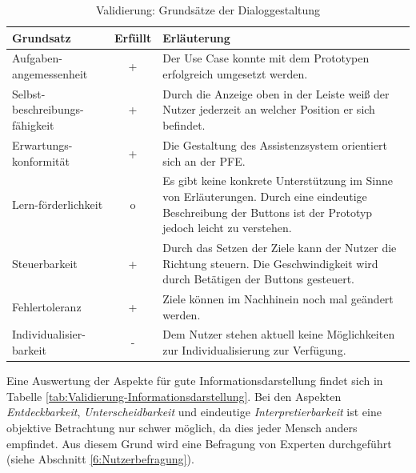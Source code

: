 \begin{table}[htb]
\caption{Validierung: Grundsätze der Dialoggestaltung}
\centering
\begin{tabular}{p{}|c|p{}}
\textbf{Grundsatz} & \textbf{Erfüllt} & \textbf{Erläuterung} \\
\hline
Aufgaben-angemessenheit & + & Der Use Case konnte mit dem Prototypen erfolgreich umgesetzt werden. \\
\hline
Selbst-beschreibungs-fähigkeit & + & Durch die Anzeige oben in der Leiste weiß der Nutzer jederzeit an welcher Position er sich befindet. \\
\hline
Erwartungs-konformität & + & Die Gestaltung des Assistenzsystem orientiert sich an der PFE.\\
\hline
Lern-förderlichkeit & o & Es gibt keine konkrete Unterstützung im Sinne von Erläuterungen. Durch eine eindeutige Beschreibung der Buttons ist der Prototyp jedoch leicht zu verstehen. \\
\hline
Steuerbarkeit & + & Durch das Setzen der Ziele kann der Nutzer die Richtung steuern. Die Geschwindigkeit wird durch Betätigen der Buttons gesteuert. \\
\hline
Fehlertoleranz & + & Ziele können im Nachhinein noch mal geändert werden. \\
\hline
Individualisier-barkeit & - & Dem Nutzer stehen aktuell keine Möglichkeiten zur Individualisierung zur Verfügung. \\
\end{tabular}
\label{tab:Validierung-Dialoggestaltung}
\end{table}

Eine Auswertung der Aspekte für gute Informationsdarstellung findet sich in Tabelle \ref{tab:Validierung-Informationsdarstellung}. Bei den Aspekten \textit{Entdeckbarkeit}, \textit{Unterscheidbarkeit} und eindeutige \textit{Interpretierbarkeit} ist eine objektive Betrachtung nur schwer möglich, da dies jeder Mensch anders empfindet. Aus diesem Grund wird eine Befragung von Experten durchgeführt (siehe Abschnitt \ref{6:Nutzerbefragung}).

